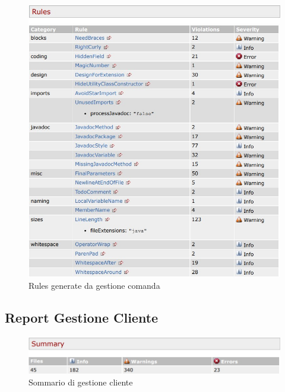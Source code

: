 \begin{figure}[htbp]
	\centering
	\includegraphics[scale=0.8]{iterazione1/images/Cs_rules_Gestione_Comanda.jpg}
	\caption{Rules generate da gestione comanda\label{fig:Cs_Rules_Gestione_Comanda}}
\end{figure}

\newpage

\subsection{Report Gestione Cliente}

\begin{figure}[htbp]
	\centering
	\includegraphics[scale=0.6]{iterazione1/images/Cs_Summary_Gestione_Cliente.jpg}
	\caption{Sommario di gestione cliente\label{fig:Cs_Summary_Gestione_Cliente}}
\end{figure}

